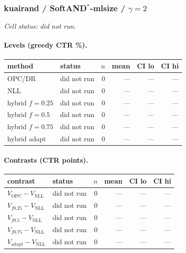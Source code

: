 \documentclass[10pt,a4paper]{article}
\begin{document}
\subsubsection{kuairand / SoftAND$^*$-mlsize / $\gamma=2$}
\emph{Cell status: did not run}.
\paragraph{Levels (greedy CTR \%).}
{\centering\small\begin{tabular}{llrrrr}
\toprule method & status & $n$ & mean & CI lo & CI hi \\
\midrule
OPC/DR & did not run & 0 & --- & --- & --- \\
NLL & did not run & 0 & --- & --- & --- \\
hybrid $f{=}0.25$ & did not run & 0 & --- & --- & --- \\
hybrid $f{=}0.5$ & did not run & 0 & --- & --- & --- \\
hybrid $f{=}0.75$ & did not run & 0 & --- & --- & --- \\
hybrid adapt & did not run & 0 & --- & --- & --- \\
\bottomrule\end{tabular}\par}
\paragraph{Contrasts (CTR points).}
{\centering\small\begin{tabular}{llrrrr}
\toprule contrast & status & $n$ & mean & CI lo & CI hi \\
\midrule
$V_{\mathrm{OPC}}-V_{\mathrm{NLL}}$ & did not run & 0 & --- & --- & --- \\
$V_{f0.25}-V_{\mathrm{NLL}}$ & did not run & 0 & --- & --- & --- \\
$V_{f0.5}-V_{\mathrm{NLL}}$ & did not run & 0 & --- & --- & --- \\
$V_{f0.75}-V_{\mathrm{NLL}}$ & did not run & 0 & --- & --- & --- \\
$V_{\mathrm{adapt}}-V_{\mathrm{NLL}}$ & did not run & 0 & --- & --- & --- \\
\bottomrule\end{tabular}\par}
\end{document}
